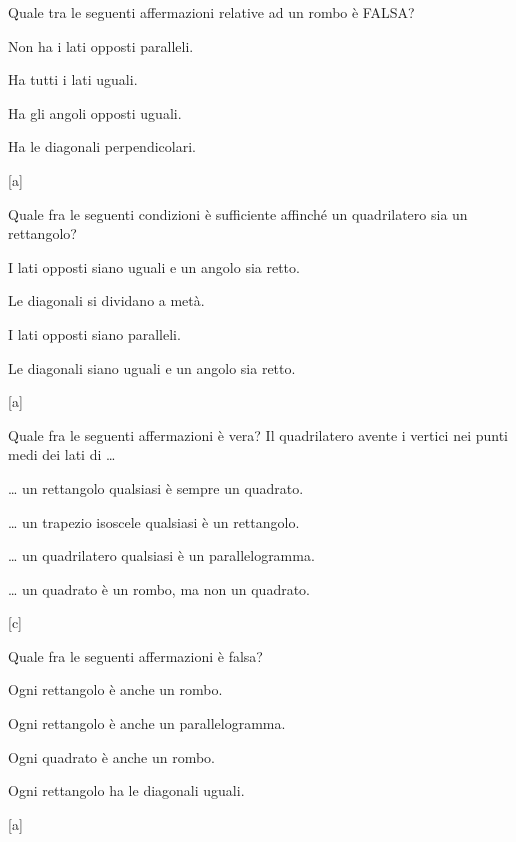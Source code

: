 \begin{esercizio}
\label{ese:4.63}
Quale tra le seguenti affermazioni relative ad un rombo è FALSA?
\begin{multicols}{2}
\begin{enumeratea}
\item Non ha i lati opposti paralleli.
\item Ha tutti i lati uguali.
\item Ha gli angoli opposti uguali.
\item Ha le diagonali perpendicolari.
\end{enumeratea}
\end{multicols}
\hfill[a]
\end{esercizio}

\begin{esercizio}
\label{ese:4.64}
Quale fra le seguenti condizioni è sufficiente affinché un 
quadrilatero sia un rettangolo?
\begin{enumeratea}
\item I lati opposti siano uguali e un angolo sia retto.
\item Le diagonali si dividano a metà.
\item I lati opposti siano paralleli.
\item Le diagonali siano uguali e un angolo sia retto.
\end{enumeratea}
\hfill[a]
\end{esercizio}

\begin{esercizio}
\label{ese:4.65}
Quale fra le seguenti affermazioni è vera?
Il quadrilatero avente i vertici nei punti medi dei lati di \ldots{}
\begin{enumeratea}
\item \ldots{} un rettangolo qualsiasi è sempre un quadrato.
\item \ldots{} un trapezio isoscele qualsiasi è un rettangolo.
\item \ldots{} un quadrilatero qualsiasi è un parallelogramma.
\item \ldots{} un quadrato è un rombo, ma non un quadrato.
\end{enumeratea}
\hfill[c]
\end{esercizio}

\begin{esercizio}
\label{ese:4.66}
Quale fra le seguenti affermazioni è falsa?
\begin{enumeratea}
\item Ogni rettangolo è anche un rombo.
\item Ogni rettangolo è anche un parallelogramma.
\item Ogni quadrato è anche un rombo.
\item Ogni rettangolo ha le diagonali uguali.
\end{enumeratea}
\hfill[a]
\end{esercizio}

